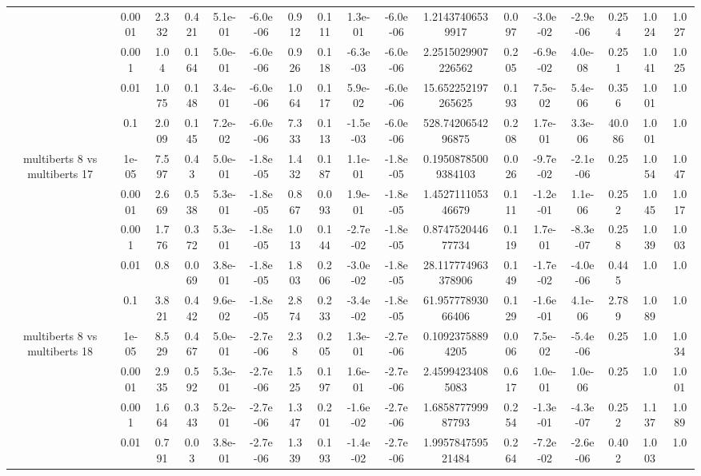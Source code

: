 \begin{tabular}{|c|c|c|c|c|c|c|c|c|c|c|c|c|c|c|c|c|}
 & 0.0001 & 2.332 & 0.421 & 5.1e-01 & -6.0e-06 & 0.912 & 0.111 & 1.3e-01 & -6.0e-06 & 1.21437406539917 & 0.097 & -3.0e-02 & -2.9e-06 & 0.254 & 1.024 & 1.027 \\
 & 0.001 & 1.04 & 0.164 & 5.0e-01 & -6.0e-06 & 0.926 & 0.118 & -6.3e-03 & -6.0e-06 & 2.2515029907226562 & 0.205 & -6.9e-02 & 4.0e-08 & 0.251 & 1.041 & 1.025 \\
 & 0.01 & 1.075 & 0.148 & 3.4e-01 & -6.0e-06 & 1.064 & 0.117 & 5.9e-02 & -6.0e-06 & 15.652252197265625 & 0.193 & 7.5e-02 & 5.4e-06 & 0.356 & 1.001 & 1.0 \\
 & 0.1 & 2.009 & 0.145 & 7.2e-02 & -6.0e-06 & 7.333 & 0.113 & -1.5e-03 & -6.0e-06 & 528.7420654296875 & 0.208 & 1.7e-01 & 3.3e-06 & 40.086 & 1.001 & 1.0 \\
\hline
\multirow{5}{*}{multiberts 8 vs multiberts 17} & 1e-05 & 7.597 & 0.43 & 5.0e-01 & -1.8e-05 & 1.432 & 0.187 & 1.1e-01 & -1.8e-05 & 0.19508785009384103 & 0.026 & -9.7e-02 & -2.1e-06 & 0.25 & 1.054 & 1.047 \\
 & 0.0001 & 2.669 & 0.538 & 5.3e-01 & -1.8e-05 & 0.867 & 0.093 & 1.9e-01 & -1.8e-05 & 1.452711105346679 & 0.111 & -1.2e-01 & 1.1e-06 & 0.252 & 1.045 & 1.017 \\
 & 0.001 & 1.776 & 0.372 & 5.3e-01 & -1.8e-05 & 1.013 & 0.144 & -2.7e-02 & -1.8e-05 & 0.874752044677734 & 0.119 & 1.7e-01 & -8.3e-07 & 0.258 & 1.039 & 1.003 \\
 & 0.01 & 0.8 & 0.069 & 3.8e-01 & -1.8e-05 & 1.803 & 0.206 & -3.0e-02 & -1.8e-05 & 28.117774963378906 & 0.149 & -1.7e-02 & -4.0e-06 & 0.445 & 1.0 & 1.0 \\
 & 0.1 & 3.821 & 0.442 & 9.6e-02 & -1.8e-05 & 2.874 & 0.233 & -3.4e-02 & -1.8e-05 & 61.95777893066406 & 0.129 & -1.6e-01 & 4.1e-06 & 2.789 & 1.089 & 1.0 \\
\hline
\multirow{5}{*}{multiberts 8 vs multiberts 18} & 1e-05 & 8.529 & 0.467 & 5.0e-01 & -2.7e-06 & 2.38 & 0.205 & 1.3e-01 & -2.7e-06 & 0.10923758894205 & 0.006 & 7.5e-02 & -5.4e-06 & 0.25 & 1.0 & 1.034 \\
 & 0.0001 & 2.935 & 0.592 & 5.3e-01 & -2.7e-06 & 1.525 & 0.197 & 1.6e-01 & -2.7e-06 & 2.45994234085083 & 0.617 & 1.0e-01 & 1.0e-06 & 0.25 & 1.0 & 1.001 \\
 & 0.001 & 1.664 & 0.343 & 5.2e-01 & -2.7e-06 & 1.347 & 0.201 & -1.6e-02 & -2.7e-06 & 1.685877799987793 & 0.254 & -1.3e-01 & -4.3e-07 & 0.252 & 1.137 & 1.089 \\
 & 0.01 & 0.791 & 0.03 & 3.8e-01 & -2.7e-06 & 1.339 & 0.193 & -1.4e-02 & -2.7e-06 & 1.995784759521484 & 0.264 & -7.2e-02 & -2.6e-06 & 0.402 & 1.003 & 1.0 \\

\end{tabular}
